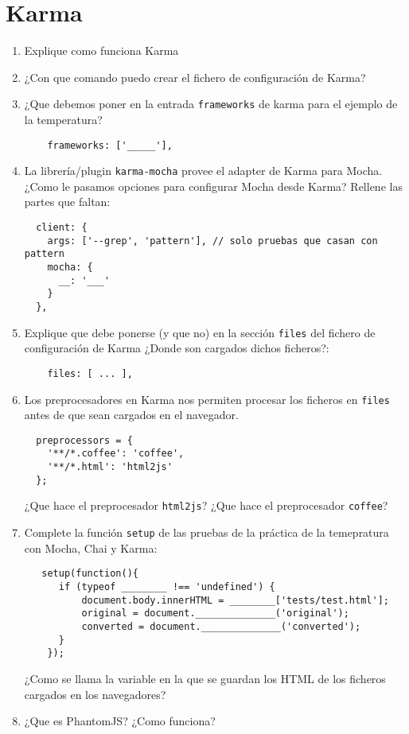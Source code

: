 \documentclass[spanish,a4paper,11pt]{article}
\begin{document}
\section{Karma}
\begin{enumerate}
\item 
Explique como funciona Karma
\item 
¿Con que comando puedo crear el fichero de configuración de Karma?
\item  ¿Que debemos poner en la entrada \verb|frameworks| de karma para el ejemplo de la temperatura?
\begin{verbatim}
    frameworks: ['_____'],
\end{verbatim}
\item La librería/plugin \verb|karma-mocha| provee el adapter de Karma para Mocha.
¿Como le pasamos opciones para configurar Mocha desde Karma?
Rellene las partes que faltan:
\begin{verbatim}
  client: {
    args: ['--grep', 'pattern'], // solo pruebas que casan con pattern
    mocha: {
      __: '___'
    }
  },
\end{verbatim}
\item 
Explique que debe ponerse (y que no) en la sección \verb|files| del fichero de
configuración de Karma ¿Donde son cargados dichos ficheros?:
\begin{verbatim}
    files: [ ... ],
\end{verbatim}

\item 
Los preprocesadores en Karma nos permiten procesar los ficheros en \verb|files| 
antes de que sean cargados en el navegador.

\begin{verbatim}
  preprocessors = {
    '**/*.coffee': 'coffee',
    '**/*.html': 'html2js'
  };
\end{verbatim}
¿Que hace el preprocesador \verb|html2js|?
¿Que hace el preprocesador \verb|coffee|?
\item Complete la función \verb|setup| de las pruebas de la práctica de la temepratura
con Mocha, Chai y Karma:
\begin{verbatim}
   setup(function(){
      if (typeof ________ !== 'undefined') {
          document.body.innerHTML = ________['tests/test.html'];
          original = document.______________('original');
          converted = document.______________('converted');
      }
    });
\end{verbatim}
¿Como se llama la variable en la que se guardan los HTML de los ficheros cargados en los
navegadores?
\item 
¿Que es PhantomJS? ¿Como funciona?
\end{enumerate}
\end{document}
